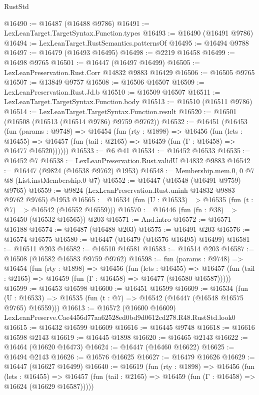 \begin{lexlean}{RustStd}
\begin{coremodule}
@16490 := @16487 (@16488 @9786)
@16491 := LexLeanTarget.TargetSyntax.Function.types
@16493 := @16490 (@16491 @9786)
@16494 := LexLeanTarget.RustSemantics.patternsOf
@16495 := @16494 @9788
@16497 := @16479 (@16493 @16495)
@16498 := @2219 @16458
@16499 := @16498 @9765
@16501 := @16447 (@16497 @16499)
@16505 := LexLeanPreservation.Rust.Corr @14832 @9883 @16429
@16506 := @16505 @9765
@16507 := @13849 @9757
@16508 := @16506 @16507
@16509 := LexLeanPreservation.Rust.Jd.b
@16510 := @16509 @16507
@16511 := LexLeanTarget.TargetSyntax.Function.body
@16513 := @16510 (@16511 @9786)
@16514 := LexLeanTarget.TargetSyntax.Function.result
@16520 := @16501 (@16508 (@16513 (@16514 @9786) @9759 @9762))
@16532 := @16451
    (@16453
      (fun (params : @9748) =>
      @16454
        (fun (rty : @1898) =>
        @16456
          (fun (lets : @16455) =>
          @16457 (fun (tail : @2165) => @16459 (fun (Γ : @16458) => @16477 @16520))))))
@16533 := @6 @41
@16534 := @16452 @16533
@16535 := @16452 @7
@16538 := LexLeanPreservation.Rust.validU @14832 @9883
@16542 := @16447 (@9824 (@16538 @9762) @1953)
@16548 := Membership.mem.{0, 0} @7 @8 (List.instMembership.{0} @7)
@16552 := @16447 (@16548 (@16491 @9759) @9765)
@16559 := @9824 (LexLeanPreservation.Rust.uninh @14832 @9883 @9762 @9765) @1953
@16565 := @16534 (fun (U : @16533) => @16535 (fun (t : @7) => @16542 (@16552 @16559)))
@16570 := @16446 (fun (fn : @38) => @16450 (@16532 @16565)) @203
@16571 := And.intro
@16572 := @16571 @16188
@16574 := @16487 (@16488 @203)
@16575 := @16491 @203
@16576 := @16574 @16575
@16580 := @16447 (@16479 (@16576 @16495) @16499)
@16581 := @16511 @203
@16582 := @16510 @16581
@16583 := @16514 @203
@16587 := @16508 (@16582 @16583 @9759 @9762)
@16598 := fun (params : @9748) =>
  @16454
    (fun (rty : @1898) =>
    @16456
      (fun (lets : @16455) =>
      @16457 (fun (tail : @2165) => @16459 (fun (Γ : @16458) => @16477 (@16580 @16587)))))
@16599 := @16453 @16598
@16600 := @16451 @16599
@16609 := @16534
    (fun (U : @16533) => @16535 (fun (t : @7) => @16542 (@16447 (@16548 @16575 @9765) @16559)))
@16613 := @16572 (@16600 @16609) LexLeanPreserve.Cae4456d77aa62528ed0bd9d0612cd278.R48.RustStd.look0
@16615 := @16432 @16599 @16609
@16616 := @16445 @9748
@16618 := @16616 @16598 @2143
@16619 := @16445 @1898
@16620 := @16465 @2143
@16622 := @16464 (@16620 @16473)
@16624 := @16447 (@16460 @16622)
@16625 := @16494 @2143
@16626 := @16576 @16625
@16627 := @16479 @16626
@16629 := @16447 (@16627 @16499)
@16640 := @16619
    (fun (rty : @1898) =>
    @16456
      (fun (lets : @16455) =>
      @16457 (fun (tail : @2165) => @16459 (fun (Γ : @16458) => @16624 (@16629 @16587)))))

\end{coremodule}
\end{lexlean}
